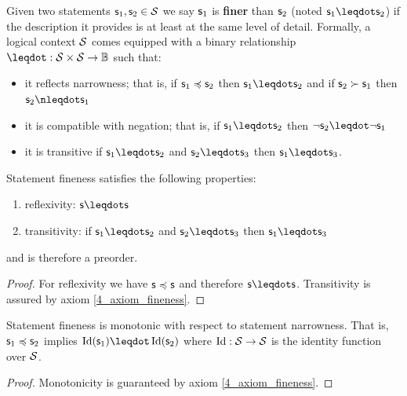 \documentclass[11pt,letterpaper,fleqn]{memoir} %
\begin{document}
\begin{mathSection}
\begin{axiom}\label{4_axiom_fineness}
	Given two statements $\mathsf{s}_1, \mathsf{s}_2 \in \mathcal{S}$ we say $\mathsf{s}_1$ is \textbf{finer} than $\mathsf{s}_2$ (noted $\stmt_1 \finer \stmt_2$) if the description it provides is at least at the same level of detail. Formally, a logical context $\mathcal{S}$ comes equipped with a binary relationship $\finer : \logCtx \times \logCtx \to \Bool$ such that:
	\begin{itemize}
		\item it reflects narrowness; that is, if $\mathsf{s}_1 \preccurlyeq \mathsf{s}_2$ then $\stmt_1 \finer \stmt_2$ and if $\mathsf{s}_2 \succ \mathsf{s}_1$ then $\stmt_2 \nfiner \stmt_1$
		\item it is compatible with negation; that is, if $\stmt_1 \finer \stmt_2$ then $\NOT \stmt_2 \finer \NOT \stmt_1$
		\item it is transitive if $\stmt_1 \finer \stmt_2$ and $\stmt_2 \finer \stmt_3$ then $\stmt_1 \finer \stmt_3$.
	\end{itemize}
\end{axiom}

\begin{prop}
	Statement fineness satisfies the following properties:
	\begin{enumerate}
		\item reflexivity: $\stmt \finer \stmt$
		\item transitivity: if $\stmt_1 \finer \stmt_2$ and $\stmt_2 \finer \stmt_3$ then $\stmt_1 \finer \stmt_3$
	\end{enumerate}
	and is therefore a preorder.
\end{prop}
\begin{proof}
	For reflexivity we have $\mathsf{s} \preccurlyeq \mathsf{s}$ and therefore $\stmt \finer \stmt$. Transitivity is assured by axiom \ref{4_axiom_fineness}.
\end{proof}

\begin{coro}
	Statement fineness is monotonic with respect to statement narrowness. That is, $\mathsf{s}_1 \preccurlyeq \mathsf{s}_2$ implies $\Id(\stmt_1) \finer \Id(\stmt_2)$ where $\operatorname{Id} : \mathcal{S} \to \mathcal{S}$ is the identity function over $\mathcal{S}$.
\end{coro}
\begin{proof}
	Monotonicity is guaranteed by axiom \ref{4_axiom_fineness}.
\end{proof}

\end{mathSection}
\end{document}
